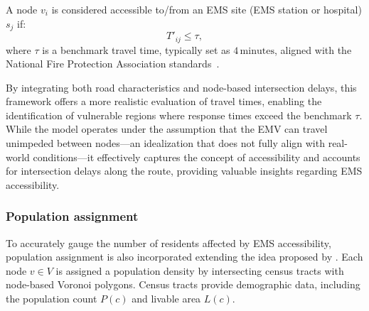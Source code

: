 A node \( v_i \) is considered accessible to/from an EMS site (EMS station or hospital) \( s_j \) if:
\begin{equation}
    T'_{ij} \leq \tau,
\end{equation}
where \( \tau \) is a benchmark travel time, typically set as \( 4 \, \mathrm{minutes} \), aligned with the National Fire Protection Association standards~\cite{NFPA1710}.

By integrating both road characteristics and node-based intersection delays, this framework offers a more realistic evaluation of travel times, enabling the identification of vulnerable regions where response times exceed the benchmark \( \tau \). While the model operates under the assumption that the EMV can travel unimpeded between nodes—an idealization that does not fully align with real-world conditions—it effectively captures the concept of accessibility and accounts for intersection delays along the route, providing valuable insights regarding EMS accessibility.

\subsubsection{Population assignment}\label{subsubsec:pop_assignment}
To accurately gauge the number of residents affected by EMS accessibility, population assignment is also incorporated extending the idea proposed by \cite{chung2024access}. Each node \( v \in V \) is assigned a population density by intersecting census tracts with node-based Voronoi polygons\cite{burrough20158}. Census tracts provide demographic data, including the population count \( P(c) \) and livable area \( L(c) \). 

